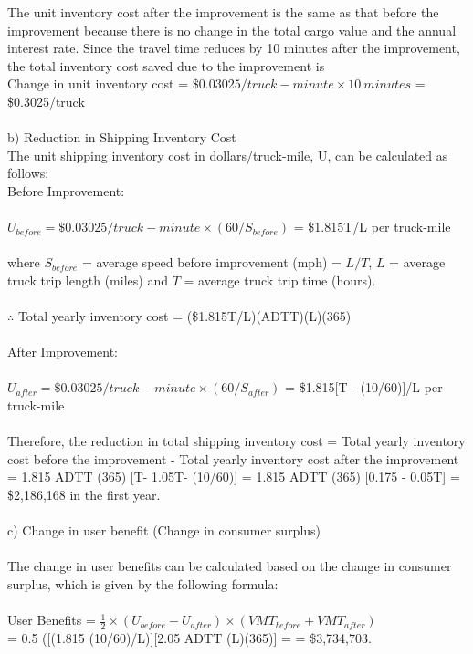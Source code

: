 The unit inventory cost after the improvement is the same as that before the improvement because there is no change in the total cargo value and the annual interest rate. Since the travel time reduces by 10 minutes after the improvement, the total inventory cost saved due to the improvement is\\
Change in unit inventory cost = $ \$0.03025/truck-minute \times 10 \: minutes $ = \$0.3025/truck\\\\
b) Reduction in Shipping Inventory Cost\\
The unit shipping inventory cost in dollars/truck-mile, U, can be calculated as follows:\\
Before Improvement:\\\\
$ U_{before} = \$0.03025/truck-minute \times (60/S_{before}) $ = \$1.815T/L per truck-mile\\\\
where $ S_{before} $ = average speed before improvement (mph) = $ L/T $, $ L $ = average truck trip length (miles) and $ T $ = average truck trip time (hours).\\\\
$ \therefore $ Total yearly inventory cost = (\$1.815T/L)(ADTT)(L)(365)\\\\
After Improvement:\\\\
$ U_{after} = \$0.03025/truck-minute \times (60/S_{after})$ = \$1.815[T - (10/60)]/L per truck-mile\\\\
Therefore, the reduction in total shipping inventory cost = Total yearly inventory cost before the improvement - Total yearly inventory cost after the improvement = 1.815 ADTT (365) [T- 1.05{T- (10/60)}] = 1.815 ADTT (365) [0.175 - 0.05T] = \$2,186,168 in the first year.\\\\
c) Change in user benefit (Change in consumer surplus)\\\\
The change in user benefits can be calculated based on the change in consumer surplus, which is given by the following formula:\\\\
User Benefits = $ \frac{1}{2} \times (U_{before} -U_{after}) \times (VMT_{before} + VMT_{after})$\\
\hspace*{2cm} = 0.5 ([(1.815 (10/60)/L)][2.05 ADTT (L)(365)] = = \$3,734,703.
%
